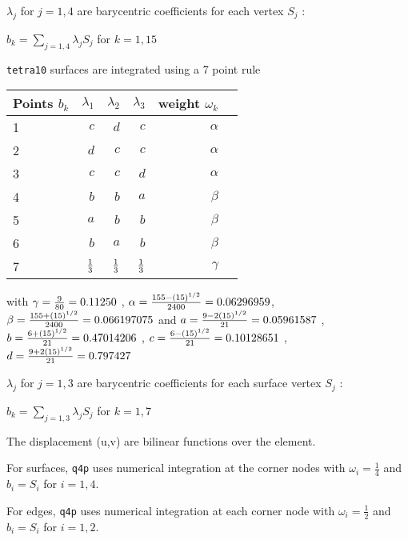 $\lambda_j$ for $j=1,4$ are barycentric coefficients for each vertex $S_j$ :

$b_k=\sum_{j=1,4}\lambda_j S_j$ for $k=1,15$

{\tt tetra10} surfaces are integrated using a 7 point rule

\begin{center}\begin{tabular}{|l|r|r|r|r|r|}
\hline
Points $b_k$    & $\lambda_1$   & $\lambda_2$   & $\lambda_3$  & weight $\omega_k$   \\ \hline   
1 & $c$ & $d$  & $c$& $\alpha$  \\ \hline 
2 & $d$ & $c$  & $c$& $\alpha$  \\ \hline 
3 & $c$ & $c$  & $d$& $\alpha$  \\ \hline 
4 & $b$ & $b$  & $a$& $\beta$   \\ \hline 
5 & $a$ & $b$  & $b$& $\beta$   \\ \hline   
6 & $b$ & $a$  & $b$& $\beta$   \\ \hline 
7 & ${ 1 \over 3 }$ & ${ 1 \over 3 }$ & ${1 \over 3 }$ & $\gamma$  \\ \hline  
\end{tabular} \end{center}

with $ \gamma = { 9 \over 80} = 0.11250 $ , $ \alpha = { {155 - \sqrt{15}} \over 2400 } = 0.06296959 $,  $ \beta = { {155 + \sqrt{15}} \over 2400 } = 0.066197075 $ and $ a =  {{9 - 2 \sqrt{15}} \over 21 } = 0.05961587 $ ,
      $ b =  { {6 + \sqrt{15}} \over 21 } = 0.47014206 $ ,
      $ c =  { {6 - \sqrt{15}} \over 21 } = 0.10128651 $ ,
      $ d =  {{9 + 2  \sqrt{15}} \over 21 } = 0.797427 $

$\lambda_j$ for $j=1,3$ are barycentric coefficients for each surface vertex $S_j$ :

$b_k=\sum_{j=1,3}\lambda_j S_j$ for $k=1,7$



The displacement (u,v) are bilinear functions over the element.

For surfaces, {\tt q4p} uses numerical integration at the corner nodes with $\omega_i=\frac{1}{4}$ and $b_i=S_i$ for $i=1,4$.

For edges, {\tt q4p} uses numerical integration at each corner node with $\omega_i=\frac{1}{2}$ and  $b_i=S_i$ for $i=1,2$.


